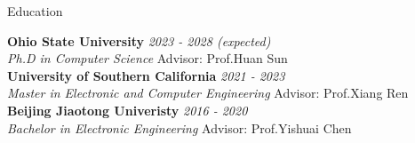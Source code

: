 \documentclass{resume} %
\begin{document}

\begin{rSection}{Education}

{\bf Ohio State University} \hfill {\em 2023 - 2028 (expected)} 
\\ \textit{Ph.D in Computer Science} \hfill {Advisor: Prof.Huan Sun}
\\

{\bf University of Southern California} \hfill {\em 2021 - 2023 } 
\\ \textit{Master in Electronic and Computer Engineering} \hfill {Advisor: Prof.Xiang Ren}
\\

{\bf Beijing Jiaotong Univeristy} \hfill {\em 2016 - 2020 } 
\\ \textit{Bachelor in Electronic Engineering} \hfill {Advisor: Prof.Yishuai Chen}
\\
\end{rSection}
\end{document}
